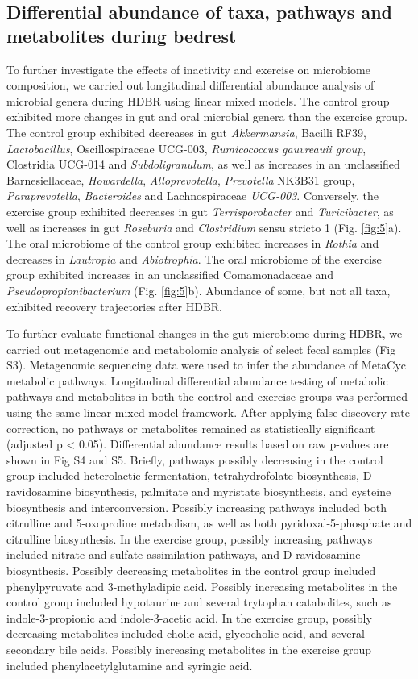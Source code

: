 \documentclass[preprint,12pt,authoryear]{elsarticle}
\begin{document}
\subsection{Differential abundance of taxa, pathways and metabolites during bedrest}

    To further investigate the effects of inactivity and exercise on microbiome composition, we carried out longitudinal differential abundance analysis of microbial genera during HDBR using linear mixed models. The control group exhibited more changes in gut and oral microbial genera than the exercise group. The control group exhibited decreases in gut \textit{Akkermansia}, Bacilli RF39, \textit{Lactobacillus}, Oscillospiraceae UCG-003, \textit{Rumicococcus gauvreauii group}, Clostridia UCG-014 and \textit{Subdoligranulum}, as well as increases in an unclassified Barnesiellaceae, \textit{Howardella}, \textit{Alloprevotella}, \textit{Prevotella} NK3B31 group, \textit{Paraprevotella}, \textit{Bacteroides} and Lachnospiraceae \textit{UCG-003}. Conversely, the exercise group exhibited decreases in gut \textit{Terrisporobacter} and \textit{Turicibacter}, as well as increases in gut \textit{Roseburia} and \textit{Clostridium} sensu stricto 1 (Fig. \ref{fig:5}a). The oral microbiome of the control group exhibited increases in \textit{Rothia} and decreases in \textit{Lautropia} and \textit{Abiotrophia}. The oral microbiome of the exercise group exhibited increases in an unclassified Comamonadaceae and \textit{Pseudopropionibacterium} (Fig. \ref{fig:5}b). Abundance of some, but not all taxa, exhibited recovery trajectories after HDBR.

    To further evaluate functional changes in the gut microbiome during HDBR, we carried out metagenomic and metabolomic analysis of select fecal samples (Fig S3). Metagenomic sequencing data were used to infer the abundance of MetaCyc metabolic pathways. Longitudinal differential abundance testing of metabolic pathways and metabolites in both the control and exercise groups was performed using the same linear mixed model framework. After applying false discovery rate correction, no pathways or metabolites remained as statistically significant (adjusted p < 0.05). Differential abundance results based on raw p-values are shown in Fig S4 and S5. Briefly, pathways possibly decreasing in the control group included heterolactic fermentation, tetrahydrofolate biosynthesis, D-ravidosamine biosynthesis, palmitate and myristate biosynthesis, and cysteine biosynthesis and interconversion. Possibly increasing pathways included both citrulline and 5-oxoproline metabolism, as well as both pyridoxal-5-phosphate and citrulline biosynthesis. In the exercise group, possibly increasing pathways included nitrate and sulfate assimilation pathways, and D-ravidosamine biosynthesis. Possibly decreasing metabolites in the control group included phenylpyruvate and 3-methyladipic acid. Possibly increasing metabolites in the control group included hypotaurine and several trytophan catabolites, such as indole-3-propionic and indole-3-acetic acid. In the exercise group, possibly decreasing metabolites included cholic acid, glycocholic acid, and several secondary bile acids. Possibly increasing metabolites in the exercise group included phenylacetylglutamine and syringic acid.
   
\end{document}
